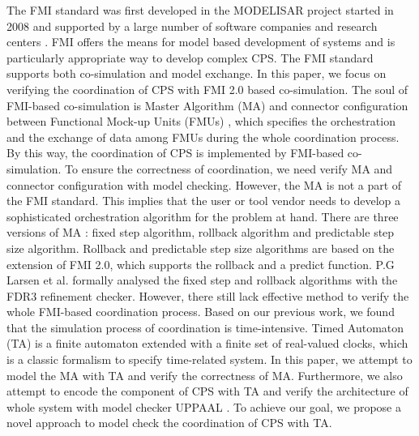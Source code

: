 The FMI standard was first developed in the MODELISAR project started in 2008 and supported by a large number of software companies and research centers \cite{ClauMODELISAR}. FMI offers the means for model based development of systems and is particularly appropriate way to develop complex CPS. The FMI standard supports both co-simulation and  model exchange. In this paper, we focus on verifying the coordination of CPS with FMI 2.0 based co-simulation.
The soul of FMI-based co-simulation is Master Algorithm (MA) \cite{AckerDVM15} and connector configuration between Functional Mock-up Units (FMUs) \cite{Tripakis15}, which specifies the orchestration and the exchange of data among FMUs during the whole coordination process. By this way, the coordination of CPS is implemented by FMI-based co-simulation. To ensure the correctness of coordination, we need verify MA and connector configuration with model checking. However, the MA is not a part of the FMI standard. This implies that the user or tool vendor needs to develop a sophisticated orchestration algorithm for the problem at hand. 
There are three versions of MA \cite{BromanBGLMTW13}: fixed step algorithm, rollback algorithm and predictable step size algorithm. Rollback and predictable step size algorithms are based on the extension of FMI 2.0, which supports the rollback and a predict function. P.G Larsen et al. \cite{Larsen2016Integrated} formally analysed the fixed step and rollback algorithms with the FDR3 refinement checker. However, there still lack effective method to verify the whole FMI-based coordination process. Based on our previous work, we found that the simulation process of coordination is time-intensive. Timed Automaton (TA) \cite{BehrmannDLHPYH06} is a finite automaton extended with a finite set of real-valued clocks, which is a classic formalism to specify time-related system. In this paper, we attempt to model the MA with TA and verify the correctness of MA. Furthermore, we also attempt to encode the component of CPS with TA and verify the architecture of whole system with model checker UPPAAL \cite{BehrmannDLHPYH06}. To achieve our goal, we propose a novel approach to model check the coordination of CPS with TA.


